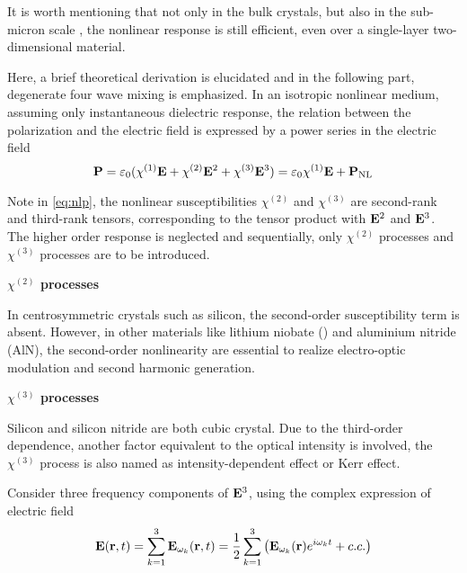 It is worth mentioning that not only in the bulk crystals, but also in the sub-micron scale \cite{Leuthold2010}, the nonlinear response is still efficient, even over a single-layer two-dimensional material.

Here, a brief theoretical derivation is elucidated and in the following part, degenerate four wave mixing is emphasized. In an isotropic nonlinear medium, assuming only instantaneous dielectric response, the relation between the polarization and the electric field is expressed by a power series in the electric field
\begin{equation}\label{eq:nlp}
    \vb{P} = \varepsilon_0 \large (\chi^{(1)}\vb{E} + \chi^{(2)}\vb{E}^2 + \chi^{(3)}\vb{E}^3)
    = \varepsilon_0 \chi^{(1)}\vb{E} + \vb{P}_\mathrm{NL}
\end{equation}

Note in \autoref{eq:nlp}, the nonlinear susceptibilities $\chi^{(2)}$ and $\chi^{(3)}$ are second-rank and third-rank tensors, corresponding to the tensor product with $\vb{E}^2$ and $\vb{E}^3$. The higher order response is neglected and sequentially, only $\chi^{(2)}$ processes and $\chi^{(3)}$ processes are to be introduced.

\bigskip
\noindent\textbf{$\chi^{(2)}$ processes} 

In centrosymmetric crystals such as silicon, the second-order susceptibility term is absent. However, in other materials like lithium niobate () and aluminium nitride (AlN), the second-order nonlinearity are essential to realize electro-optic modulation and second harmonic generation.

\bigskip
\noindent\textbf{$\chi^{(3)}$ processes} 

Silicon and silicon nitride are both cubic crystal. Due to the third-order dependence, another factor equivalent to the optical intensity is involved, the $\chi^{(3)}$ process is also named as intensity-dependent effect or Kerr effect.

Consider three frequency components of $\vb{E}^3$, using the complex expression of electric field
\begin{equation}
    \vb{E}(\vb{r}, t) = \sum_{k=1}^3 \vb{E}_{\omega_k}(\vb{r}, t) =  \frac{1}{2} \sum_{k=1}^3 \qty ( \vb{E}_{\omega_k}(\vb{r})e^{i\omega_k t} + c.c.)
\end{equation}

